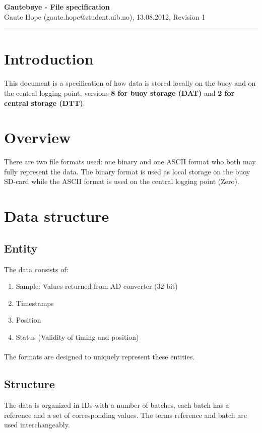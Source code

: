\documentclass[a4paper]{article}
\newcommand{\makeheading}[2]%
        {\hspace*{-\marginparsep minus \marginparwidth}%
         \begin{minipage}[t]{\textwidth\marginparwidth\marginparsep}%
           {\large \bfseries #1}\\{#2}\\[-0.15\baselineskip]%
                 \rule{\columnwidth}{1pt}%
         \end{minipage}}
\begin{document}
\makeheading{Gautebøye - File specification}{Gaute Hope
(gaute.hope@student.uib.no), 13.08.2012, Revision 1}

\vspace{2em}
\section*{Introduction}
This document is a specification of how data is stored locally on the
buoy and on the central logging point, versions \textbf{8 for buoy
storage (DAT)} and \textbf{2 for central storage (DTT)}.

\vspace{2em}

\begin{multicols}{2}
  \section{Overview}
  There are two file formats used: one binary
  and one ASCII format who both may fully represent the data.
  The binary format is used as local storage on the
  buoy SD-card while the ASCII format is used on the central logging point
  (Zero).

  \section{Data structure}
    \subsection{Entity}
    The data consists of:
    \begin{enumerate}
      \item Sample: Values returned from AD converter (32 bit)
      \item Timestamps
      \item Position
      \item Status (Validity of timing and position)
    \end{enumerate}

    \paragraph{} The formats are designed to uniquely represent these
    entities.

    \subsection{Structure}
    The data is organized in IDs with a number of batches, each batch
    has a reference and a set of corresponding values. The terms reference and
    batch are used interchangeably.


\end{multicols}
\end{document}
